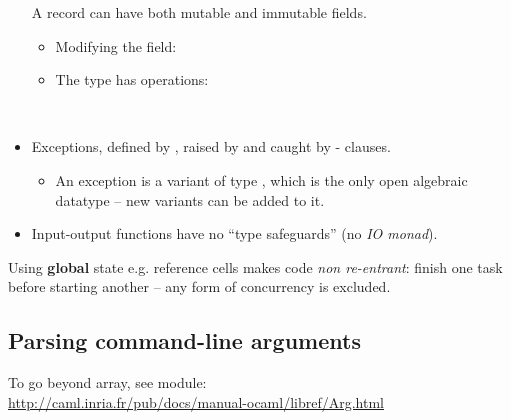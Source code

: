 \documentclass{beamer}
\newcommand{\tmem}[1]{{\em #1\/}}
\newcommand{\tmstrong}[1]{\textbf{#1}}
\begin{document}
\begin{itemize}
  {}{}{}{\hlopt{= \{ }}{}{}{\hlopt{: }}{}{\hlopt{\}}}{}
  
  A record can have both mutable and immutable fields.
  \begin{itemize}
    \item Modifying the field: {}{}{}{\hlopt{<- }}{}
    
    \item The {}type has operations:
    
    {}{\hlopt{(:=) }}{}{\hlopt{=
    }}{}{}{}{\hlopt{<-
    }}{}{\hlendline{}}\\
    {}{\hlopt{(!) }}{}{\hlopt{=
    }}{}{}{}{\hlendline{}}
  \end{itemize}
  \item Exceptions, defined by {}, raised by {}
  and caught by {}-{} clauses.
  \begin{itemize}
    \item An exception is a variant of type {}, which is the
    only open algebraic datatype -- new variants can be added to it.
  \end{itemize}
  \item Input-output functions have no ``type safeguards'' (no {\tmem{IO
  monad}}).
\end{itemize}
Using {\tmstrong{global}} state e.g. reference cells makes code {\tmem{non
re-entrant}}: finish one task before starting another -- any form of
concurrency is excluded.

\subsection{Parsing command-line arguments}

To go beyond {}{}{} array, see {}
module:\\
\href{http://caml.inria.fr/pub/docs/manual-ocaml/libref/Arg.html}{http://caml.inria.fr/pub/docs/manual-ocaml/libref/Arg.html}
\end{document}
